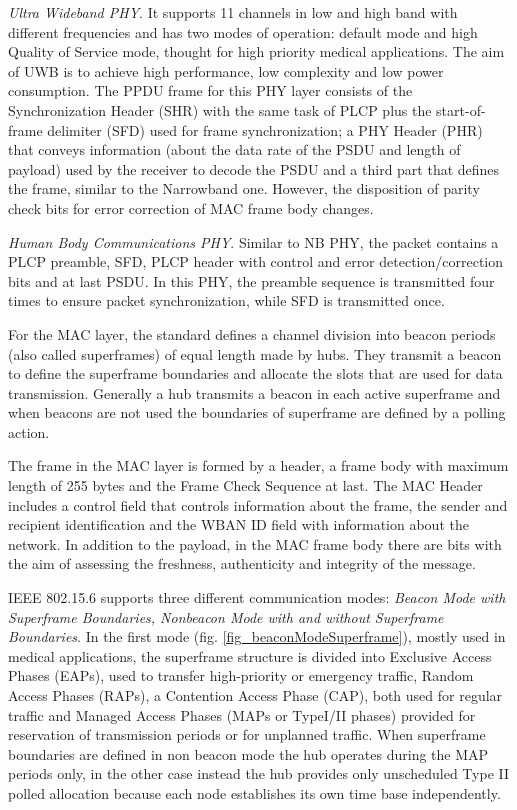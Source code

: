 \documentclass[conference]{IEEEtran}
\begin{document}
\textit{Ultra Wideband PHY}. It supports 11 channels in low and high band with different frequencies and has two modes of operation: default mode and high Quality of Service mode, thought for high priority medical applications. The aim of UWB is to achieve high performance, low complexity and low power consumption. The PPDU frame for this PHY layer consists of the Synchronization Header (SHR) with the same task of PLCP plus the start-of-frame delimiter (SFD) used for frame synchronization; a PHY Header (PHR) that conveys information (about the data rate of the PSDU and length of payload) used by the receiver to decode the PSDU and a third part that defines the frame, similar to the Narrowband one. However, the disposition of parity check bits for error correction of MAC frame body changes.
\newline

\textit{Human Body Communications PHY}. Similar to NB PHY, the packet contains a PLCP preamble, SFD, PLCP header with control and error detection/correction bits and at last PSDU. In this PHY, the preamble sequence is transmitted four times to ensure packet synchronization, while SFD is transmitted once.
\newline

For the MAC layer, the standard defines a channel division into beacon periods (also called superframes) of equal length made by hubs. They transmit a beacon to define the superframe boundaries and allocate the slots that are used for data transmission. Generally a hub transmits a beacon in each active superframe and when beacons are not used the boundaries of superframe are defined by a polling action.

The frame in the MAC layer is formed by a header, a frame body with maximum length of 255 bytes and the Frame Check Sequence at last. The MAC Header includes a control field that controls information about the frame, the sender and recipient identification and the WBAN ID field with information about the network. In addition to the payload, in the MAC frame body there are bits with the aim of assessing the freshness, authenticity and integrity of the message.

IEEE 802.15.6 supports three different communication modes: \textit{Beacon Mode with Superframe Boundaries, Nonbeacon Mode with and without Superframe Boundaries}. In the first mode (fig. \ref{fig_beaconModeSuperframe}), mostly used in medical applications, the superframe structure is divided into Exclusive Access Phases (EAPs), used to transfer high-priority or emergency traffic, Random Access Phases (RAPs), a Contention Access Phase (CAP), both used for regular traffic and Managed Access Phases (MAPs or TypeI/II phases) provided for reservation of transmission periods or for unplanned traffic. When superframe boundaries are defined in non beacon mode the hub operates during the MAP periods only, in the other case instead the hub provides only unscheduled Type II polled allocation because each node establishes its own time base independently.
\end{document}
